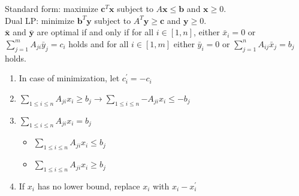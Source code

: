 Standard form: maximize $\mathbf{c}^T\mathbf{x}$ subject to $A\mathbf{x} \leq \mathbf{b}$ and $\mathbf{x} \geq 0$. \\
Dual LP: minimize $\mathbf{b}^T\mathbf{y}$ subject to $A^T\mathbf{y} \geq \mathbf{c}$ and $\mathbf{y} \geq 0$. \\
$\bar{\mathbf{x}}$ and $\bar{\mathbf{y}}$ are optimal if and only if for all $i \in [1, n]$, either $\bar{x}_i = 0$ or $\sum_{j=1}^{m}A_{ji}\bar{y}_j = c_i$ holds and for all $i \in [1, m]$ either $\bar{y}_i = 0$ or $\sum_{j=1}^{n}A_{ij}\bar{x}_j = b_j$ holds.

\begin{enumerate}
    \itemsep-0.5em
    \item In case of minimization, let $c^\prime_i = -c_i$
    \item $\sum_{1 \leq i \leq n}{A_{ji}x_i} \geq b_j \rightarrow \sum_{1 \leq i \leq n}{-A_{ji}x_i} \leq -b_j$
    \item $\sum_{1 \leq i \leq n}{A_{ji}x_i} = b_j$ 
        \vspace{-0.5em}
        \begin{itemize}
            \itemsep-0.5em
            \item $\sum_{1 \leq i \leq n}{A_{ji}x_i} \leq b_j$
            \item $\sum_{1 \leq i \leq n}{A_{ji}x_i} \geq b_j$
        \end{itemize}
    \item If $x_i$ has no lower bound, replace $x_i$ with $x_i - x_i^\prime$
\end{enumerate}
